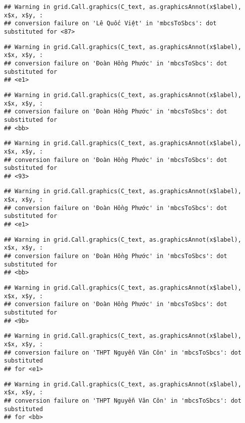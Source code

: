 \documentclass[
]{article}
\begin{document}
\begin{verbatim}
## Warning in grid.Call.graphics(C_text, as.graphicsAnnot(x$label), x$x, x$y, :
## conversion failure on 'Lê Quốc Việt' in 'mbcsToSbcs': dot substituted for <87>
\end{verbatim}

\begin{verbatim}
## Warning in grid.Call.graphics(C_text, as.graphicsAnnot(x$label), x$x, x$y, :
## conversion failure on 'Đoàn Hồng Phước' in 'mbcsToSbcs': dot substituted for
## <e1>
\end{verbatim}

\begin{verbatim}
## Warning in grid.Call.graphics(C_text, as.graphicsAnnot(x$label), x$x, x$y, :
## conversion failure on 'Đoàn Hồng Phước' in 'mbcsToSbcs': dot substituted for
## <bb>
\end{verbatim}

\begin{verbatim}
## Warning in grid.Call.graphics(C_text, as.graphicsAnnot(x$label), x$x, x$y, :
## conversion failure on 'Đoàn Hồng Phước' in 'mbcsToSbcs': dot substituted for
## <93>
\end{verbatim}

\begin{verbatim}
## Warning in grid.Call.graphics(C_text, as.graphicsAnnot(x$label), x$x, x$y, :
## conversion failure on 'Đoàn Hồng Phước' in 'mbcsToSbcs': dot substituted for
## <e1>
\end{verbatim}

\begin{verbatim}
## Warning in grid.Call.graphics(C_text, as.graphicsAnnot(x$label), x$x, x$y, :
## conversion failure on 'Đoàn Hồng Phước' in 'mbcsToSbcs': dot substituted for
## <bb>
\end{verbatim}

\begin{verbatim}
## Warning in grid.Call.graphics(C_text, as.graphicsAnnot(x$label), x$x, x$y, :
## conversion failure on 'Đoàn Hồng Phước' in 'mbcsToSbcs': dot substituted for
## <9b>
\end{verbatim}

\begin{verbatim}
## Warning in grid.Call.graphics(C_text, as.graphicsAnnot(x$label), x$x, x$y, :
## conversion failure on 'THPT Nguyễn Văn Côn' in 'mbcsToSbcs': dot substituted
## for <e1>
\end{verbatim}

\begin{verbatim}
## Warning in grid.Call.graphics(C_text, as.graphicsAnnot(x$label), x$x, x$y, :
## conversion failure on 'THPT Nguyễn Văn Côn' in 'mbcsToSbcs': dot substituted
## for <bb>
\end{verbatim}
\end{document}
